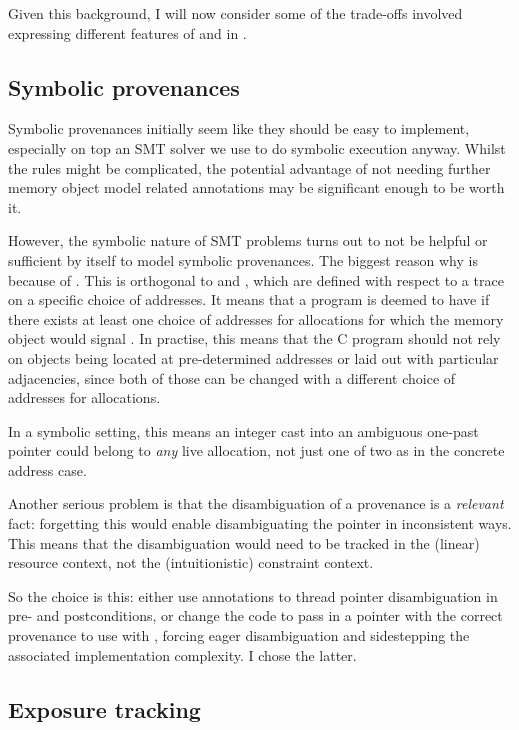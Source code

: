 Given this background, I will now consider some of the trade-offs involved
expressing different features of  and  in .

\subsection{Symbolic provenances}

Symbolic provenances initially seem like they should be easy to implement,
especially on top an SMT solver we use to do symbolic execution anyway. Whilst
the rules might be complicated, the potential advantage of not needing further
memory object model related annotations may be significant enough to be worth
it.

However, the symbolic nature of SMT problems turns out to not be helpful or
sufficient by itself to model symbolic provenances. The biggest reason why is
because of . This is
orthogonal to  and , which are defined with respect to
a trace on a specific choice of addresses. It means that a program is deemed to
have  if there exists at least one choice of addresses for allocations
for which the memory object would signal . In practise, this means that
the C program should not rely on objects being located at pre-determined
addresses or laid out with particular adjacencies, since both of those can be
changed with a different choice of addresses for allocations.

In a symbolic setting, this means an integer cast into an ambiguous one-past
pointer could belong to \emph{any} live allocation, not just one of two as in
the concrete address case.

Another serious problem is that the disambiguation of a provenance is a
\emph{relevant} fact: forgetting this would enable disambiguating the pointer
in inconsistent ways. This means that the disambiguation would need to be
tracked in the (linear) resource context, not the (intuitionistic) constraint
context.

So the choice is this: either use annotations to thread pointer disambiguation in
pre- and postconditions, or change the code to pass in a pointer with the
correct provenance to use with , forcing eager
disambiguation and sidestepping the associated implementation complexity. I
chose the latter.

\subsection{Exposure tracking}

